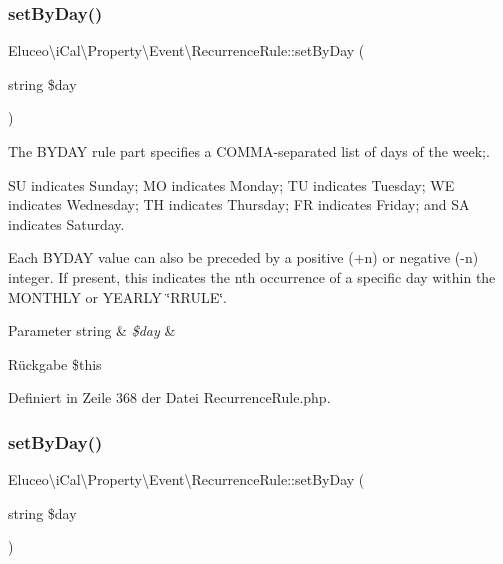 \subsubsection{\texorpdfstring{set\+By\+Day()}{setByDay()}\hspace{0.1cm}{\footnotesize\ttfamily [1/3]}}
{\footnotesize\ttfamily Eluceo\textbackslash{}i\+Cal\textbackslash{}\+Property\textbackslash{}\+Event\textbackslash{}\+Recurrence\+Rule\+::set\+By\+Day (\begin{DoxyParamCaption}\item[{string}]{\$day }\end{DoxyParamCaption})}

The B\+Y\+D\+AY rule part specifies a C\+O\+M\+M\+A-\/separated list of days of the week;.

SU indicates Sunday; MO indicates Monday; TU indicates Tuesday; WE indicates Wednesday; TH indicates Thursday; FR indicates Friday; and SA indicates Saturday.

Each B\+Y\+D\+AY value can also be preceded by a positive (+n) or negative (-\/n) integer. If present, this indicates the nth occurrence of a specific day within the M\+O\+N\+T\+H\+LY or Y\+E\+A\+R\+LY \char`\"{}\+R\+R\+U\+L\+E\char`\"{}.


\begin{DoxyParams}[1]{Parameter}
string & {\em \$day} & \\
\hline
\end{DoxyParams}
\begin{DoxyReturn}{Rückgabe}
\$this 
\end{DoxyReturn}


Definiert in Zeile 368 der Datei Recurrence\+Rule.\+php.

\mbox{\label{class_eluceo_1_1i_cal_1_1_property_1_1_event_1_1_recurrence_rule_abdbd6172cc8c72e3136d183d3009e78d}} 
\subsubsection{\texorpdfstring{set\+By\+Day()}{setByDay()}\hspace{0.1cm}{\footnotesize\ttfamily [2/3]}}
{\footnotesize\ttfamily Eluceo\textbackslash{}i\+Cal\textbackslash{}\+Property\textbackslash{}\+Event\textbackslash{}\+Recurrence\+Rule\+::set\+By\+Day (\begin{DoxyParamCaption}\item[{string}]{\$day }\end{DoxyParamCaption})}

